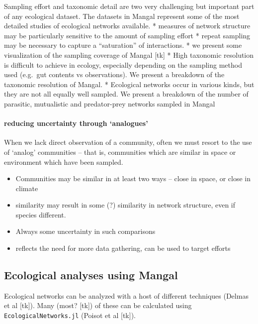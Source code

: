 Sampling effort and taxonomic detail are two very challenging but
important part of any ecological dataset. The datasets in Mangal
represent some of the most detailed studies of ecological networks
available. * measures of network structure may be particularly sensitive
to the amount of sampling effort * repeat sampling may be necessary to
capture a ``saturation'' of interactions. * we present some
visualization of the sampling coverage of Mangal {[}tk{]} * High
taxonomic resolution is difficult to achieve in ecology, especially
depending on the sampling method used (e.g.~gut contents vs
observations). We present a breakdown of the taxonomic resolution of
Mangal. * Ecological networks occur in various kinds, but they are not
all equally well sampled. We present a breakdown of the number of
parasitic, mutualistic and predator-prey networks sampled in Mangal

\hypertarget{reducing-uncertainty-through-analogues}{%
\paragraph{reducing uncertainty through
`analogues'}\label{reducing-uncertainty-through-analogues}}

When we lack direct observation of a community, often we must resort to
the use of `analog' communities -- that is, communities which are
similar in space or environment which have been sampled.

\begin{itemize}
\tightlist
\item
  Communities may be similar in at least two ways -- close in space, or
  close in climate
\item
  similarity may result in some (?) similarity in network structure,
  even if species different.
\item
  Always some uncertainty in such comparisons
\item
  reflects the need for more data gathering, can be used to target
  efforts
\end{itemize}

\hypertarget{ecological-analyses-using-mangal}{%
\subsection{Ecological analyses using
Mangal}\label{ecological-analyses-using-mangal}}

Ecological networks can be analyzed with a host of different techniques
(Delmas et al {[}tk{]}). Many (most? {[}tk{]}) of these can be
calculated using \texttt{EcologicalNetworks.jl} (Poisot et al {[}tk{]}).

